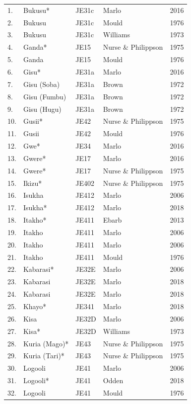 \documentclass[output=paper]{langscibook}
\begin{document}
\begin{longtable}{lllll}
1. & Bukusu* & JE31c & Marlo & 2016 \\
2. & Bukusu & JE31c & Mould & 1976 \\
3. & Bukusu & JE31c & Williams & 1973 \\
4. & Ganda* & JE15 & Nurse \& Philippson & 1975 \\
5. & Ganda & JE15 & Mould & 1976 \\
6. & Gisu* & JE31a & Marlo & 2016 \\
7. & Gisu (Soba) & JE31a & Brown & 1972 \\
8. & Gisu (Fumbu) & JE31a & Brown & 1972 \\
9. & Gisu (Hugu) & JE31a & Brown & 1972 \\
10. & Gusii* & JE42 & Nurse \& Philippson & 1975 \\
11. & Gusii & JE42 & Mould & 1976 \\
12. & Gwe* & JE34 & Marlo & 2016 \\
13. & Gwere* & JE17 & Marlo & 2016 \\
14. & Gwere* & JE17 & Nurse \& Philippson & 1975 \\
15. & Ikizu* & JE402 & Nurse \& Philippson & 1975 \\
16. & Isukha & JE412 & Marlo & 2006 \\
17. & Isukha* & JE412 & Marlo & 2018 \\
18. & Itakho* & JE411 & Ebarb & 2013 \\
19. & Itakho & JE411 & Marlo & 2006 \\
20. & Itakho & JE411 & Marlo & 2006 \\
21. & Itakho & JE411 & Mould & 1976 \\
22. & Kabarasi* & JE32E & Marlo & 2006 \\
23. & Kabarasi & JE32E & Marlo & 2018 \\
24. & Kabarasi & JE32E & Marlo & 2018 \\
25. & Khayo* & JE341 & Marlo & 2018 \\
26. & Kisa & JE32D & Marlo & 2006 \\
27. & Kisa* & JE32D & Williams & 1973 \\
28. & Kuria (Mago)* & JE43 & Nurse \& Philippson & 1975 \\
29. & Kuria (Tari)* & JE43 & Nurse \& Philippson & 1975 \\
30. & Logooli & JE41 & Marlo & 2006 \\
31. & Logooli* & JE41 & Odden & 2018 \\
32. & Logooli & JE41 & Mould & 1976 \\

\end{longtable}
\end{document}
